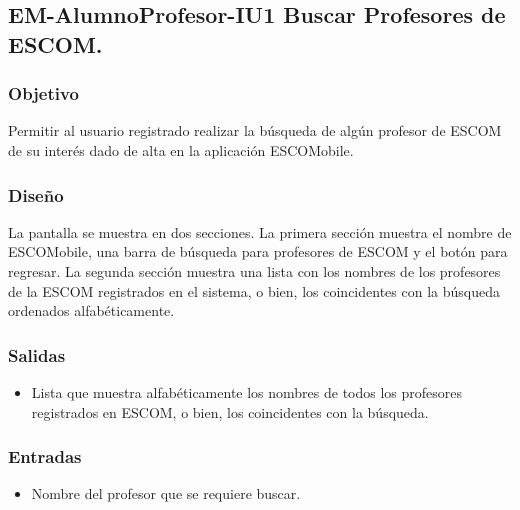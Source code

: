 




\newpage
\subsection{EM-AlumnoProfesor-IU1 Buscar Profesores de ESCOM.}

\subsubsection{Objetivo}
	\noindent
	Permitir al usuario registrado realizar la búsqueda de algún profesor de ESCOM de su interés dado
	de alta en la aplicación ESCOMobile.

\subsubsection{Diseño}
	\noindent
	La pantalla se muestra en dos secciones. La primera sección muestra el nombre de ESCOMobile, una barra de búsqueda para profesores de ESCOM y el botón para regresar. La segunda sección muestra una lista con los nombres de los profesores de la ESCOM registrados en el sistema, o bien, los coincidentes con la búsqueda ordenados alfabéticamente. 

\pagebreak
{}

\subsubsection{Salidas}
	\noindent
	\begin{itemize}
		\item Lista que muestra alfabéticamente los nombres de todos los profesores registrados en ESCOM, o bien, los coincidentes con la búsqueda. 
	\end{itemize}

\subsubsection{Entradas}
	\noindent
	\begin{itemize}
		\item Nombre del profesor que se requiere buscar.  
	\end{itemize}

